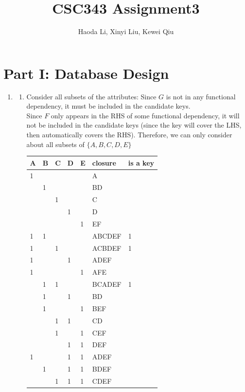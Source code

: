 \documentclass[letter, 9pt]{article}
\title{CSC343 Assignment3}
\author{Haoda Li, Xinyi Liu, Kewei Qiu}
\begin{document}
\maketitle
\section*{Part I: Database Design}
\begin{enumerate}
    \item 
    \begin{enumerate}
        \item 
    Consider all subsets of the attributes:
    Since $G$ is not in any functional dependency, it must be included in the candidate keys. \\
    Since $F$ only appears in the RHS of some functional dependency, it will not be included in the candidate keys (since the key will cover the LHS, then automatically covers the RHS). 
    Therefore, we can only consider about all subsets of $\{A,B,C,D,E\}$
\begin{center}
\begin{tabular}{|l|l|l|l|l|l|l|}
\hline
A & B & C & D & E & closure & is a key \\ \hline
1 &   &   &   &   & A       &          \\ \hline
  & 1 &   &   &   & BD      &          \\ \hline
  &   & 1 &   &   & C       &          \\ \hline
  &   &   & 1 &   & D       &          \\ \hline
  &   &   &   & 1 & EF      &          \\ \hline
1 & 1 &   &   &   & ABCDEF  & 1        \\ \hline
1 &   & 1 &   &   & ACBDEF  & 1        \\ \hline
1 &   &   & 1 &   & ADEF    &          \\ \hline
1 &   &   &   & 1 & AFE     &          \\ \hline
  & 1 & 1 &   &   & BCADEF  & 1        \\ \hline
  & 1 &   & 1 &   & BD      &          \\ \hline
  & 1 &   &   & 1 & BEF     &          \\ \hline
  &   & 1 & 1 &   & CD      &          \\ \hline
  &   & 1 &   & 1 & CEF     &          \\ \hline
  &   &   & 1 & 1 & DEF     &          \\ \hline
1 &   &   & 1 & 1 & ADEF    &          \\ \hline
  & 1 &   & 1 & 1 & BDEF    &          \\ \hline
  &   & 1 & 1 & 1 & CDEF    &          \\ \hline
\end{tabular}    
\end{center}


\end{enumerate}
\end{enumerate}
\end{document}
